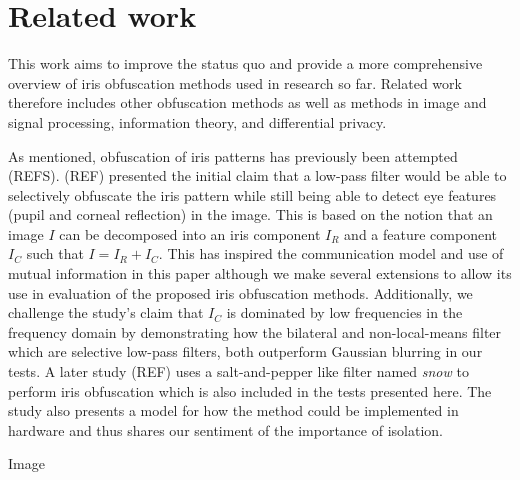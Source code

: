 \section{Related work}
This work aims to improve the status quo and provide a more comprehensive overview of iris obfuscation methods used in research so far. Related work therefore includes other obfuscation methods as well as methods in image and signal processing, information theory, and differential privacy.

As mentioned, obfuscation of iris patterns has previously been attempted (REFS). (REF) presented the initial claim that a low-pass filter would be able to selectively obfuscate the iris pattern while still being able to detect eye features (pupil and corneal reflection) in the image. This is based on the notion that an image $I$ can be decomposed into an iris component $I_R$ and a feature component $I_C$ such that $I=I_R+I_C$. This has inspired the communication model and use of mutual information in this paper although we make several extensions to allow its use in evaluation of the proposed iris obfuscation methods. Additionally, we challenge the study's claim that $I_C$ is dominated by low frequencies in the frequency domain by demonstrating how the bilateral and non-local-means filter which are selective low-pass filters, both outperform Gaussian blurring in our tests. A later study (REF) uses a salt-and-pepper like filter named \emph{snow} to perform iris obfuscation which is also included in the tests presented here. The study also presents a model for how the method could be implemented in hardware and thus shares our sentiment of the importance of isolation.

Image 

